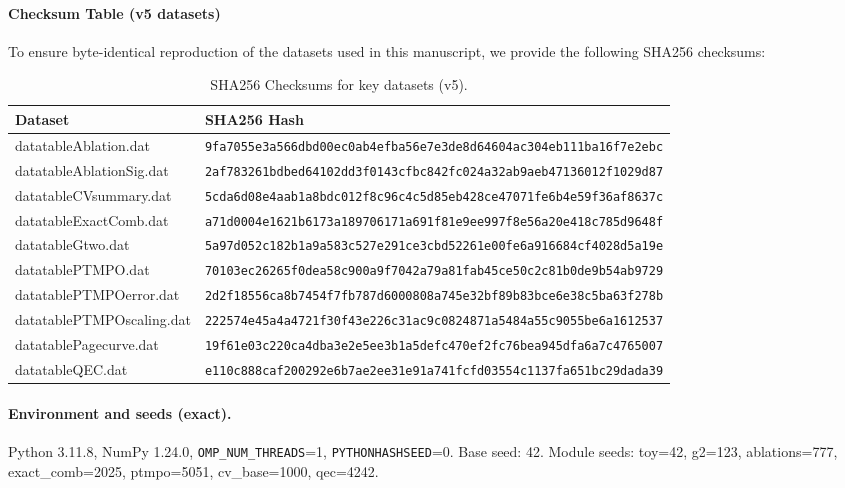 \documentclass[a4paper,11pt]{article}
\theoremstyle{plain}
\theoremstyle{definition}
\theoremstyle{remark}
\begin{document}
\paragraph{Checksum Table (v5 datasets)}
To ensure byte-identical reproduction of the datasets used in this manuscript, we provide the following SHA256 checksums:
\begin{table}[htbp]
\centering
\caption{SHA256 Checksums for key datasets (v5).}
\label{tab:checksums}
\scriptsize
\begin{tabular}{@{}lp{40em}@{}}
\toprule
\textbf{Dataset} & \textbf{SHA256 Hash} \\
\midrule
datatableAblation.dat & \texttt{9fa7055e3a566dbd00ec0ab4efba56e7e3de8d64604ac304eb111ba16f7e2ebc} \\
datatableAblationSig.dat & \texttt{2af783261bdbed64102dd3f0143cfbc842fc024a32ab9aeb47136012f1029d87} \\
datatableCVsummary.dat & \texttt{5cda6d08e4aab1a8bdc012f8c96c4c5d85eb428ce47071fe6b4e59f36af8637c} \\
datatableExactComb.dat & \texttt{a71d0004e1621b6173a189706171a691f81e9ee997f8e56a20e418c785d9648f} \\
datatableGtwo.dat & \texttt{5a97d052c182b1a9a583c527e291ce3cbd52261e00fe6a916684cf4028d5a19e} \\
datatablePTMPO.dat & \texttt{70103ec26265f0dea58c900a9f7042a79a81fab45ce50c2c81b0de9b54ab9729} \\
datatablePTMPOerror.dat & \texttt{2d2f18556ca8b7454f7fb787d6000808a745e32bf89b83bce6e38c5ba63f278b} \\
datatablePTMPOscaling.dat & \texttt{222574e45a4a4721f30f43e226c31ac9c0824871a5484a55c9055be6a1612537} \\
datatablePagecurve.dat & \texttt{19f61e03c220ca4dba3e2e5ee3b1a5defc470ef2fc76bea945dfa6a7c4765007} \\
datatableQEC.dat & \texttt{e110c888caf200292e6b7ae2ee31e91a741fcfd03554c1137fa651bc29dada39} \\
\bottomrule
\end{tabular}
\end{table}

\paragraph{Environment and seeds (exact).}
Python 3.11.8, NumPy 1.24.0, \texttt{OMP\_NUM\_THREADS}=1, \texttt{PYTHONHASHSEED}=0.
Base seed: 42. Module seeds: toy=42, g2=123, ablations=777, exact\_comb=2025, ptmpo=5051, cv\_base=1000, qec=4242.
\end{document}
